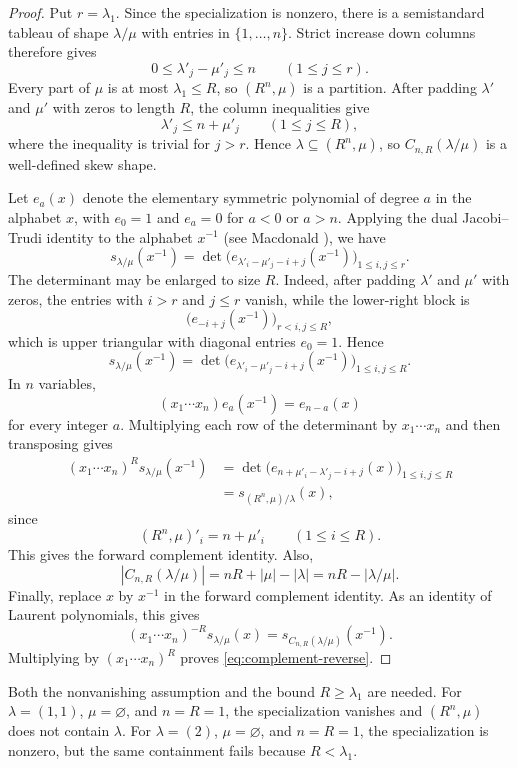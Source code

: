 \documentclass[11pt]{article}
\theoremstyle{definition}
\begin{document}
\begin{proof}
Put $r=\lambda_1$.  Since the specialization is nonzero, there is a
semistandard tableau of shape $\lambda/\mu$ with entries in
$\{1,\ldots,n\}$.  Strict increase down columns therefore gives
\[
  0\le\lambda'_j-\mu'_j\le n
  \qquad (1\le j\le r).
\]
Every part of $\mu$ is at most $\lambda_1\le R$, so $(R^n,\mu)$ is a
partition.  After padding $\lambda'$ and $\mu'$ with zeros to length $R$, the
column inequalities give
\[
  \lambda'_j\le n+\mu'_j
  \qquad (1\le j\le R),
\]
where the inequality is trivial for $j>r$.  Hence
$\lambda\subseteq(R^n,\mu)$, so $C_{n,R}(\lambda/\mu)$ is a well-defined skew
shape.

Let $e_a(x)$ denote the elementary symmetric polynomial of degree $a$ in the
alphabet $x$, with $e_0=1$ and $e_a=0$ for $a<0$ or $a>n$.  Applying the dual
Jacobi--Trudi identity to the alphabet $x^{-1}$ (see
Macdonald \cite[Chapter~I, (5.5)]{Macdonald}), we have
\[
  s_{\lambda/\mu}(x^{-1})
  =\det\bigl(
      e_{\lambda'_i-\mu'_j-i+j}(x^{-1})
    \bigr)_{1\le i,j\le r}.
\]
The determinant may be enlarged to size $R$.  Indeed, after padding
$\lambda'$ and $\mu'$ with zeros, the entries with $i>r$ and $j\le r$ vanish,
while the lower-right block is
\[
  \bigl(e_{-i+j}(x^{-1})\bigr)_{r<i,j\le R},
\]
which is upper triangular with diagonal entries $e_0=1$.  Hence
\[
  s_{\lambda/\mu}(x^{-1})
  =\det\bigl(
      e_{\lambda'_i-\mu'_j-i+j}(x^{-1})
    \bigr)_{1\le i,j\le R}.
\]
In $n$ variables,
\[
  (x_1\cdots x_n)e_a(x^{-1})=e_{n-a}(x)
\]
for every integer $a$.
Multiplying each row of the determinant by $x_1\cdots x_n$ and then
transposing gives
\begin{align*}
  (x_1\cdots x_n)^R s_{\lambda/\mu}(x^{-1})
  &=\det\bigl(
      e_{n+\mu'_i-\lambda'_j-i+j}(x)
    \bigr)_{1\le i,j\le R}\\
  &=s_{(R^n,\mu)/\lambda}(x),
\end{align*}
since
\[
  (R^n,\mu)'_i=n+\mu'_i
  \qquad (1\le i\le R).
\]
This gives the forward complement identity.  Also,
\[
  |C_{n,R}(\lambda/\mu)|
  =nR+|\mu|-|\lambda|
  =nR-|\lambda/\mu|.
\]
Finally, replace $x$ by $x^{-1}$ in the forward complement identity.  As an
identity of Laurent polynomials, this gives
\[
  (x_1\cdots x_n)^{-R}s_{\lambda/\mu}(x)
  =s_{C_{n,R}(\lambda/\mu)}(x^{-1}).
\]
Multiplying by $(x_1\cdots x_n)^R$ proves
\eqref{eq:complement-reverse}.
\end{proof}

Both the nonvanishing assumption and the bound $R\ge\lambda_1$ are needed.
For
$\lambda=(1,1)$, $\mu=\varnothing$, and $n=R=1$, the specialization vanishes
and $(R^n,\mu)$ does not contain $\lambda$.  For $\lambda=(2)$,
$\mu=\varnothing$, and $n=R=1$, the specialization is nonzero, but the same
containment fails because $R<\lambda_1$.
\end{document}
